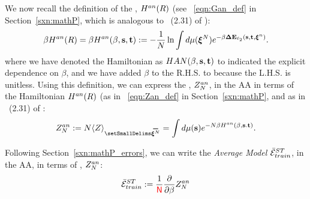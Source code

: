 We now recall the definition of the \AnnealedHamiltonian, $H^{an}(R)$ (see \EQN~\ref{eqn:Gan_def} in Section~\ref{sxn:mathP}, which is analogous to \EQN~(2.31) of \cite{SST92}):
\begin{align}
\label{eqn:Gan0}
\beta H^{an}(R) = \beta H^{an}(\beta,{\mathbf{s}},{\mathbf{t}}):=-\frac{1}{N}\ln \int d\mu(\boldsymbol{\xi}^{N})e^{-\beta\mathbf{\Delta {E}}_{\ell_2}({\mathbf{s}},{\mathbf{t}}, \boldsymbol{\xi}^{n})}  .
\end{align}
where we have denoted the Hamiltonian as $HAN(\beta,{\mathbf{s}},{\mathbf{t}})$ to indicated the explicit dependence on $\beta$,
and we have added $\beta$ to the R.H.S. to because the L.H.S. is unitless.
%
Using this definition, we can express the \Annealed \PartitionFunction, $Z^{an}_{N}$, in the AA in terms of the \Annealed Hamiltonian $H^{an}(R)$
(as in \EQN~\ref{eqn:Zan_def} in Section~\ref{sxn:mathP}, and as in \EQN~(2.31) of \cite{SST92}:
\begin{align}
 \label{eqn:Zan}
Z^{an}_{\ND}:=\ND\langle Z\rangle_{\AVGNDXI}=\int d\mu(\SVEC)e^{-\ND\beta\HAN(\beta,\SVEC.\TVEC)}  .
\end{align}

Following Section~\ref{sxn:mathP_errors}, we can write the \emph{Average Model \TrainingError} $\bar{\mathcal{E}}^{ST}_{train}$, in the AA,
in terms of \Annealed \PartitionFunction, $Z^{an}_{N}$:
\begin{align}
 \label{eqn:AVGSTTE_AA}
\bar{\mathcal{E}}^{ST}_{train}:= \frac{1}{{\color{red}\sf{N}}}\dfrac{\partial }{\partial \beta} Z^{an}_{N}
\end{align}

